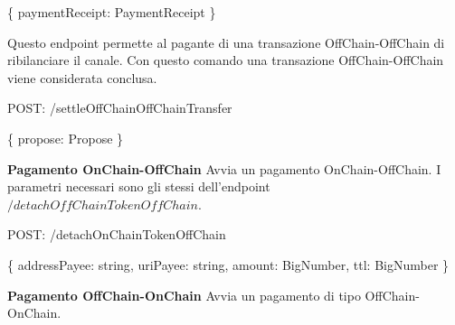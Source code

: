 \documentclass[12pt,italian,]{book}
\newenvironment{Shaded}{}{}
\newcommand{\DataTypeTok}[1]{\textcolor[rgb]{0.56,0.13,0.00}{#1}}
\newcommand{\NormalTok}[1]{#1}
\newcommand{\OperatorTok}[1]{\textcolor[rgb]{0.40,0.40,0.40}{#1}}
\newcommand{\SpecialStringTok}[1]{\textcolor[rgb]{0.73,0.40,0.53}{#1}}
\begin{document}
\begin{Shaded}
\begin{Highlighting}[]
\OperatorTok{\{}
    \DataTypeTok{paymentReceipt}\OperatorTok{:}\NormalTok{ PaymentReceipt}
\OperatorTok{\}}
\end{Highlighting}
\end{Shaded}

Questo endpoint permette al pagante di una transazione OffChain-OffChain di ribilanciare il canale. Con questo comando una transazione OffChain-OffChain viene considerata conclusa.

\begin{Shaded}
\begin{Highlighting}[]
\NormalTok{POST}\OperatorTok{:} \SpecialStringTok{/settleOffChainOffChainTransfer}
\end{Highlighting}
\end{Shaded}

\begin{Shaded}
\begin{Highlighting}[]
\OperatorTok{\{}
    \DataTypeTok{propose}\OperatorTok{:}\NormalTok{ Propose}
\OperatorTok{\}}
\end{Highlighting}
\end{Shaded}

\textbf{\textbf{Pagamento OnChain-OffChain}} Avvia un pagamento OnChain-OffChain. I parametri necessari sono gli stessi dell'endpoint \(/detachOffChainTokenOffChain\).

\begin{Shaded}
\begin{Highlighting}[]
\NormalTok{POST}\OperatorTok{:} \SpecialStringTok{/detachOnChainTokenOffChain}
\end{Highlighting}
\end{Shaded}

\begin{Shaded}
\begin{Highlighting}[]
\OperatorTok{\{}
    \DataTypeTok{addressPayee}\OperatorTok{:}\NormalTok{ string}\OperatorTok{,}
    \DataTypeTok{uriPayee}\OperatorTok{:}\NormalTok{ string}\OperatorTok{,}
    \DataTypeTok{amount}\OperatorTok{:}\NormalTok{ BigNumber}\OperatorTok{,}
    \DataTypeTok{ttl}\OperatorTok{:}\NormalTok{ BigNumber}
\OperatorTok{\}}
\end{Highlighting}
\end{Shaded}

\textbf{\textbf{Pagamento OffChain-OnChain}} Avvia un pagamento di tipo OffChain-OnChain.
\end{document}
